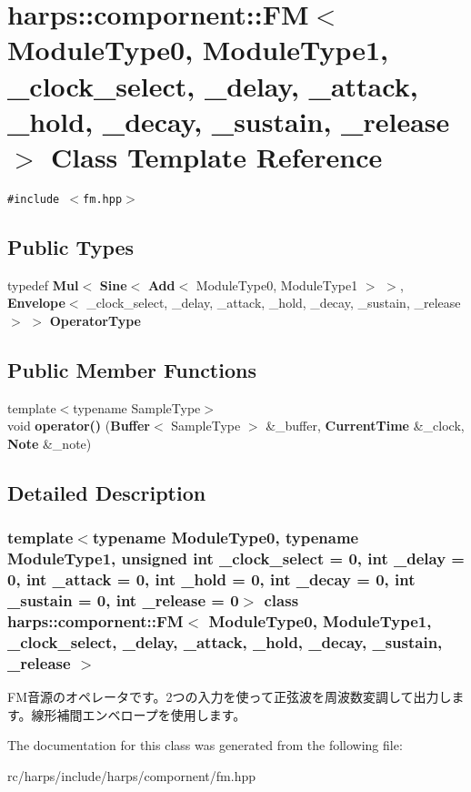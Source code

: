 \section{harps::compornent::FM$<$ ModuleType0, ModuleType1, \_\-clock\_\-select, \_\-delay, \_\-attack, \_\-hold, \_\-decay, \_\-sustain, \_\-release $>$ Class Template Reference}
\label{classharps_1_1compornent_1_1FM}
{\tt \#include $<$fm.hpp$>$}

\subsection*{Public Types}
\begin{CompactItemize}
\item 
typedef {\bf Mul}$<$ {\bf Sine}$<$ {\bf Add}$<$ ModuleType0, ModuleType1 $>$ $>$, {\bf Envelope}$<$ \_\-clock\_\-select, \_\-delay, \_\-attack, \_\-hold, \_\-decay, \_\-sustain, \_\-release $>$ $>$ \textbf{OperatorType}\label{classharps_1_1compornent_1_1FM_886c27da348512aaa4f524a23b57990b}

\end{CompactItemize}
\subsection*{Public Member Functions}
\begin{CompactItemize}
\item 
{\footnotesize template$<$typename SampleType$>$ }\\void \textbf{operator()} ({\bf Buffer}$<$ SampleType $>$ \&\_\-buffer, {\bf CurrentTime} \&\_\-clock, {\bf Note} \&\_\-note)\label{classharps_1_1compornent_1_1FM_6705ad0ccfaf5d3f69ebe71f779e3e5f}

\end{CompactItemize}


\subsection{Detailed Description}
\subsubsection*{template$<$typename ModuleType0, typename ModuleType1, unsigned int \_\-clock\_\-select = 0, int \_\-delay = 0, int \_\-attack = 0, int \_\-hold = 0, int \_\-decay = 0, int \_\-sustain = 0, int \_\-release = 0$>$ class harps::compornent::FM$<$ ModuleType0, ModuleType1, \_\-clock\_\-select, \_\-delay, \_\-attack, \_\-hold, \_\-decay, \_\-sustain, \_\-release $>$}

FM音源のオペレータです。2つの入力を使って正弦波を周波数変調して出力します。線形補間エンベロープを使用します。 

The documentation for this class was generated from the following file:\begin{CompactItemize}
\item 
rc/harps/include/harps/compornent/fm.hpp\end{CompactItemize}
